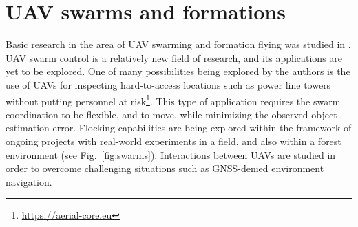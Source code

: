\documentclass[a4paper,11pt,titlepage,twoside]{book}
\newcommand{\reffig}[1]{Fig.~\ref{#1}}
\begin{document}



\section{UAV swarms and formations}
\label{sec:uav_swarms_and_formations}

Basic research in the area of \ac{UAV} swarming and formation flying was studied in \cite{saska2020formation, saska2016formations, saska2019large}.
\ac{UAV} swarm control is a relatively new field of research, and its applications are yet to be explored.
One of many possibilities being explored by the authors is the use of \acp{UAV} for inspecting hard-to-access locations such as power line towers without putting personnel at risk\footnote{\url{https://aerial-core.eu}}.
This type of application requires the swarm coordination to be flexible, and to move, while minimizing the observed object estimation error.
Flocking capabilities are being explored within the framework of ongoing projects with real-world experiments in a field, and also within a forest environment (see \reffig{fig:swarms}).
Interactions between \acp{UAV} are studied in order to overcome challenging situations such as GNSS-denied environment navigation.

\end{document}
